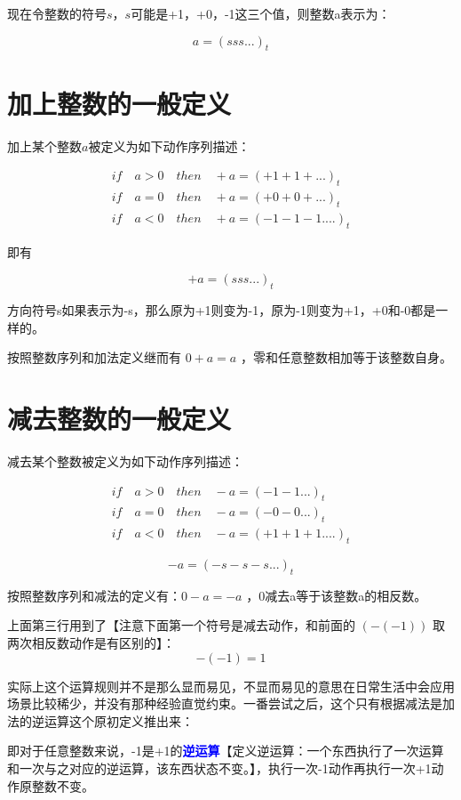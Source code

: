\documentclass[12pt,oneside]{book}
\renewcommand{\emph}[1]{\textcolor{blue}{\textbf{#1}}}
\begin{document}
现在令整数的符号$s$，$s$可能是+1，+0，-1这三个值，则整数a表示为：

\[
a = (sss...)_t
\]

\section{加上整数的一般定义}
加上某个整数$a$被定义为如下动作序列描述：

\begin{align*}
if \quad a>0 \quad then \quad +a=(+1+1+...)_t\\
if \quad a=0 \quad then \quad +a=(+0+0+...)_t\\
if \quad a<0 \quad then \quad +a=(-1-1-1....)_t
\end{align*}

即有

\[
+a = (sss...)_t
\]

方向符号s如果表示为-s，那么原为+1则变为-1，原为-1则变为+1，+0和-0都是一样的。

按照整数序列和加法定义继而有 $0+a = a$ ，零和任意整数相加等于该整数自身。


\section{减去整数的一般定义}
减去某个整数被定义为如下动作序列描述：

\begin{align}
if \quad a>0 \quad then \quad -a=(-1-1...)_t\\
if \quad a=0 \quad then \quad -a=(-0-0...)_t\\
if \quad a<0 \quad then \quad -a=(+1+1+1....)_t
\end{align}

\[
-a = (-s-s-s...)_t
\]

按照整数序列和减法的定义有：$0-a=-a$  ，0减去a等于该整数a的相反数。

上面第三行用到了【注意下面第一个符号是减去动作，和前面的 $(-(-1))$ 取两次相反数动作是有区别的】：
\begin{equation}
-(-1) = 1
\end{equation}

实际上这个运算规则并不是那么显而易见，不显而易见的意思在日常生活中会应用场景比较稀少，并没有那种经验直觉约束。一番尝试之后，这个只有根据减法是加法的逆运算这个原初定义推出来：

即对于任意整数来说，-1是+1的\emph{逆运算}【定义逆运算：一个东西执行了一次运算和一次与之对应的逆运算，该东西状态不变。】，执行一次-1动作再执行一次+1动作原整数不变。
\end{document}
